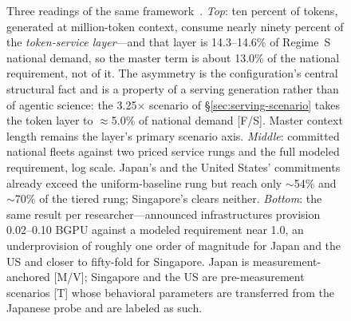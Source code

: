 \begin{figure}[htbp]
\caption[The AI4S sizing results]{Three readings of the same framework~\cite{ai4s-framework}. \emph{Top}: ten
percent of tokens, generated at million-token context, consume nearly ninety percent of the \emph{token-service
layer}---and that layer is 14.3--14.6\% of Regime~S national demand, so the master term is about 13.0\% of the
national requirement, not of it. The asymmetry is the configuration's central structural fact and is a property of
a serving generation rather than of agentic science: the 3.25$\times$ scenario of \S\ref{sec:serving-scenario} takes
the token layer to $\approx$5.0\% of national demand [F/S]. Master context length remains the layer's primary
scenario axis. \emph{Middle}: committed national fleets against two priced service
rungs and the full modeled requirement, log scale. Japan's and the United States' commitments already exceed the
uniform-baseline rung but reach only $\sim$54\% and $\sim$70\% of the tiered rung; Singapore's clears neither.
\emph{Bottom}: the same result per researcher---announced infrastructures provision 0.02--0.10 BGPU against a
modeled requirement near 1.0, an underprovision of roughly one order of magnitude for Japan and the US and
closer to fifty-fold for Singapore. Japan is measurement-anchored [M/V]; Singapore and the US are
pre-measurement scenarios [T] whose behavioral parameters are transferred from the Japanese probe and are
labeled as such.}
\label{fig:ai4s-plots}
\end{figure}
